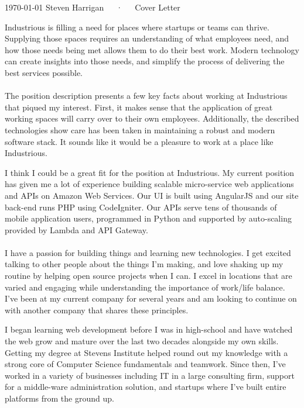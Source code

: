 \documentclass[11pt, a4paper]{awesome-cv}
\begin{document}
\makecvheader[C]

\makecvfooter
  {\today}
  {Steven Harrigan~~~·~~~Cover Letter}
  {\thepage}

\makelettertitle

\begin{cvletter}

Industrious is filling a need for places where startups or teams can thrive. Supplying those spaces requires an understanding of what employees need, and how those needs being met allows them to do their best work. Modern technology can create insights into those needs, and simplify the process of delivering the best services possible.\\\\The position description presents a few key facts about working at Industrious that piqued my interest. First, it makes sense that the application of great working spaces will carry over to their own employees. Additionally, the described technologies show care has been taken in maintaining a robust and modern software stack. It sounds like it would be a pleasure to work at a place like Industrious.

I think I could be a great fit for the position at Industrious. My current position has given me a lot of experience building scalable micro-service web applications and APIs on Amazon Web Services. Our UI is built using AngularJS and our site back-end runs PHP using CodeIgniter. Our APIs serve tens of thousands of mobile application users, programmed in Python and supported by auto-scaling provided by Lambda and API Gateway.\\\\I have a passion for building things and learning new technologies. I get excited talking to other people about the things I'm making, and love shaking up my routine by helping open source projects when I can. I excel in locations that are varied and engaging while understanding the importance of work/life balance. I've been at my current company for several years and am looking to continue on with another company that shares these principles.

I began learning web development before I was in high-school and have watched the web grow and mature over the last two decades alongside my own skills. Getting my degree at Stevens Institute helped round out my knowledge with a strong core of Computer Science fundamentals and teamwork. Since then, I've worked in a variety of businesses including IT in a large consulting firm, support for a middle-ware administration solution, and startups where I've built entire platforms from the ground up.

\end{cvletter}


\makeletterclosing
\end{document}
